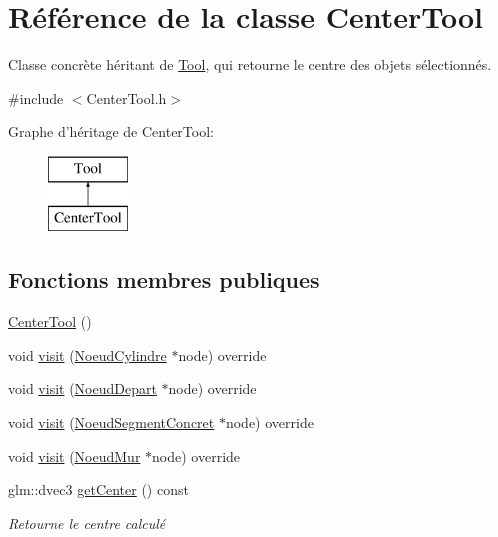 \hypertarget{class_center_tool}{\section{Référence de la classe Center\-Tool}
\label{class_center_tool}
}


Classe concrète héritant de \hyperlink{class_tool}{Tool}, qui retourne le centre des objets sélectionnés.  




{\ttfamily \#include $<$Center\-Tool.\-h$>$}

Graphe d'héritage de Center\-Tool\-:\begin{figure}[H]
\begin{center}
\leavevmode
\includegraphics[height=2.000000cm]{class_center_tool}
\end{center}
\end{figure}
\subsection*{Fonctions membres publiques}
\begin{DoxyCompactItemize}
\item 
\hyperlink{group__inf2990_ga3814d534b50e7dff7fbd7efef552685d}{Center\-Tool} ()
\item 
void \hyperlink{group__inf2990_ga9ceff880a444e12bc6b4dab4313c1809}{visit} (\hyperlink{class_noeud_cylindre}{Noeud\-Cylindre} $\ast$node) override
\item 
void \hyperlink{group__inf2990_ga8417547d629ccacfa218979e6ba6cdf5}{visit} (\hyperlink{class_noeud_depart}{Noeud\-Depart} $\ast$node) override
\item 
void \hyperlink{group__inf2990_gac441b1692c3b057050ced592ba372263}{visit} (\hyperlink{class_noeud_segment_concret}{Noeud\-Segment\-Concret} $\ast$node) override
\item 
void \hyperlink{group__inf2990_ga13d2bac067f4262be4fd60c302a07124}{visit} (\hyperlink{class_noeud_mur}{Noeud\-Mur} $\ast$node) override
\item 
glm\-::dvec3 \hyperlink{group__inf2990_gaf086e5f530c5189f4b72563a4abfe35f}{get\-Center} () const 
\begin{DoxyCompactList}\small\item\em Retourne le centre calculé \end{DoxyCompactList}\end{DoxyCompactItemize}

